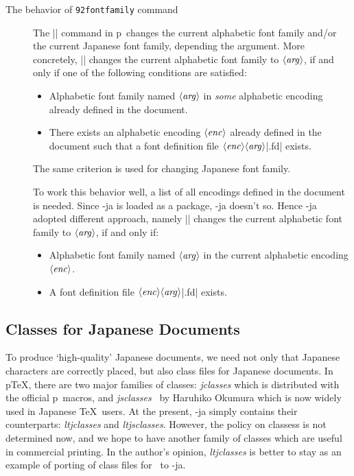 \documentclass{ajt}
\begin{document}
\begin{description}
\item[The behavior of\/ {\tt\char92fontfamily\/} command]
The |\fontfamily| command in p\LaTeXe\ changes the current alphabetic
	   font family and/or the current Japanese font family,
	   depending the argument. More concretely,
	   || changes the
	   current alphabetic font family to $\langle\hbox{\it
	   arg\/}\rangle$, if and only if one of the following
	   conditions are satisfied:
\begin{itemize}
\item Alphabetic font family named $\langle\hbox{\it arg\/}\rangle$ in
      \emph{some} alphabetic encoding already defined in the document.
\item There exists an alphabetic encoding $\langle\hbox{\it
      enc\/}\rangle$ already defined in the document such that a font
      definition file $\langle\hbox{\it enc\/}\rangle\langle\hbox{\it
      arg\/}\rangle$|.fd| exists.
\end{itemize}
The same criterion is used for changing Japanese font family.

To work this behavior well, a list of all encodings defined in the
	   document is needed. Since \LuaTeX-ja is loaded as a package,
	   \LuaTeX-ja doesn't so.  Hence \LuaTeX-ja adopted different
	   approach, namely || changes the current alphabetic font family
	   to $\langle\hbox{\it arg\/}\rangle$, if and only if:
\begin{itemize}
\item Alphabetic font family named $\langle\hbox{\it arg\/}\rangle$ in
      the current alphabetic encoding $\langle\hbox{\it enc\/}\rangle$.
\item A  font definition file $\langle\hbox{\it enc\/}\rangle\langle\hbox{\it
      arg\/}\rangle$|.fd| exists.
\end{itemize}


\end{description}



\subsection{Classes for Japanese Documents}
To produce `high-quality' Japanese documents, we need not only that
Japanese characters are correctly placed, but also class files for
Japanese documents. In p\TeX, there are two major families of classes:
\emph{jclasses} which is distributed with the official p\LaTeXe\ macros,
and \emph{jsclasses}~\cite{jsclasses} by Haruhiko Okumura which is now
widely used in Japanese \TeX\ users.  At the present, \LuaTeX-ja simply
contains their counterparts: \emph{ltjclasses} and
\emph{ltjsclasses}. However, the policy on classess is not determined
now, and we hope to have another family of classes which are useful in
commercial printing.  In the author's opinion, \emph{ltjclasses} is
better to stay as an example of porting of class files for \pTeX\ to
\LuaTeX-ja.
\end{document}
